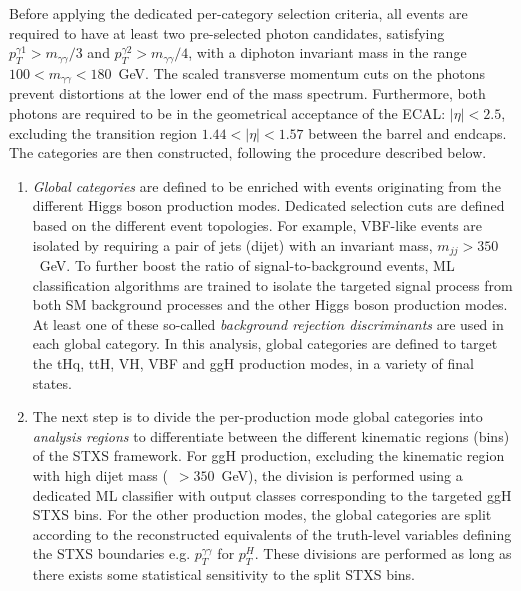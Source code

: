 Before applying the dedicated per-category selection criteria, all events are required to have at least two pre-selected photon candidates, satisfying $p_T^{\gamma 1}>m_{\gamma\gamma}/3$ and ${p_T^{\gamma 2}>m_{\gamma\gamma}/4}$, with a diphoton invariant mass in the range $100<m_{\gamma\gamma}<180$~GeV. The scaled transverse momentum cuts on the photons prevent distortions at the lower end of the mass spectrum. Furthermore, both photons are required to be in the geometrical acceptance of the ECAL: $|\eta|<2.5$, excluding the transition region $1.44<|\eta|<1.57$ between the barrel and endcaps. The categories are then constructed, following the procedure described below.

\begin{enumerate}
    \item \textit{Global categories} are defined to be enriched with events originating from the different Higgs boson production modes. Dedicated selection cuts are defined based on the different event topologies. For example, VBF-like events are isolated by requiring a pair of jets (dijet) with an invariant mass, $m_{jj}>350$~GeV. To further boost the ratio of signal-to-background events, ML classification algorithms are trained to isolate the targeted signal process from both SM background processes and the other Higgs boson production modes. At least one of these so-called \textit{background rejection discriminants} are used in each global category. In this analysis, global categories are defined to target the tHq, ttH, VH, VBF and ggH production modes, in a variety of final states.
    
    \item The next step is to divide the per-production mode global categories into \textit{analysis regions} to differentiate between the different kinematic regions (bins) of the STXS framework. For ggH production, excluding the kinematic region with high dijet mass (\mjj~$>350$~GeV), the division is performed using a dedicated ML classifier with output classes corresponding to the targeted ggH STXS bins. For the other production modes, the global categories are split according to the reconstructed equivalents of the truth-level variables defining the STXS boundaries e.g. $p_T^{\gamma\gamma}$ for $p_T^H$. These divisions are performed as long as there exists some statistical sensitivity to the split STXS bins. 
    

\end{enumerate}
